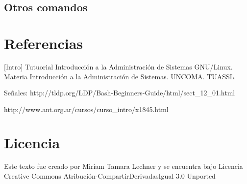 \documentclass[12pt]{article}
\begin{document}
\subsection*{Otros comandos}




\section*{Referencias}

[Intro] Tutuorial Introducción a la Administración de Sistemas GNU/Linux. Materia Introducción
a la Administración de Sistemas. UNCOMA. TUASSL. 

Señales: http://tldp.org/LDP/Bash-Beginners-Guide/html/sect\_12\_01.html

http://www.ant.org.ar/cursos/curso\_intro/x1845.html

\section*{Licencia}

Este texto fue creado por Miriam Tamara Lechner y se encuentra bajo 
Licencia Creative Commons Atribución-CompartirDerivadasIgual 3.0 Unported
\end{document}
